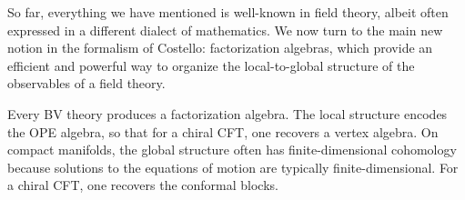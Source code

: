 So far, everything we have mentioned is well-known in field theory, 
albeit often expressed in a different dialect of mathematics.
We now turn to the main new notion in the formalism of Costello:
factorization algebras, which provide an efficient and powerful way to organize the local-to-global structure of the observables of a field theory.

\begin{lesson}[\cite{CG1,CG2}]
Every BV theory produces a factorization algebra. 
The local structure encodes the OPE algebra, so that for a chiral CFT, one recovers a vertex algebra. 
On compact manifolds, the global structure often has finite-dimensional cohomology because solutions to the equations of motion are typically finite-dimensional.
For a chiral CFT, one recovers the conformal blocks.
\end{lesson}

